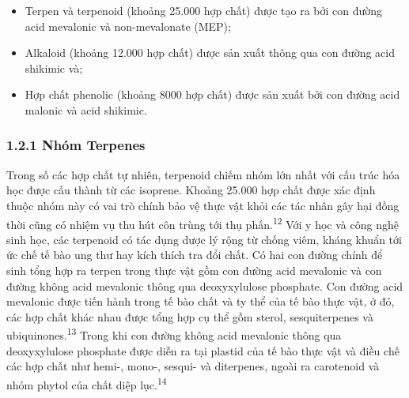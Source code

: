 \documentclass[
  letterpaper,
  DIV=11,
  numbers=noendperiod]{scrartcl}
\begin{document}
\begin{itemize}
\item
  Terpen và terpenoid (khoảng 25.000 hợp chất) được tạo ra bởi con đường
  acid mevalonic và non-mevalonate (MEP);
\item
  Alkaloid (khoảng 12.000 hợp chất) được sản xuất thông qua con đường
  acid shikimic và;
\item
  Hợp chất phenolic (khoảng 8000 hợp chất) được sản xuất bởi con đường
  acid malonic và acid shikimic.
\end{itemize}

\subsubsection{1.2.1 Nhóm Terpenes}\label{nhuxf3m-terpenes}

Trong số các hợp chất tự nhiên, terpenoid chiếm nhóm lớn nhất với cấu
trúc hóa học được cấu thành từ các isoprene. Khoảng 25.000 hợp chất được
xác định thuộc nhóm này có vai trò chính bảo vệ thực vật khỏi các tác
nhân gây hại đồng thời cũng có nhiệm vụ thu hút côn trùng tới thụ
phấn.\textsuperscript{12} Với y học và công nghệ sinh học, các terpenoid
có tác dụng dược lý rộng từ chống viêm, kháng khuẩn tới ức chế tế bào
ung thư hay kích thích tra đổi chất. Có hai con đường chính để sinh tổng
hợp ra terpen trong thực vật gồm con đường acid mevalonic và con đường
không acid mevalonic thông qua deoxyxylulose phosphate. Con đường acid
mevalonic được tiến hành trong tế bào chất và ty thể của tế bào thực
vật, ở đó, các hợp chất khác nhau được tổng hợp cụ thể gồm sterol,
sesquiterpenes và ubiquinones.\textsuperscript{13} Trong khi con đường
không acid mevalonic thông qua deoxyxylulose phosphate được diễn ra tại
plastid của tế bào thực vật và điều chế các hợp chất như hemi-, mono-,
sesqui- và diterpenes, ngoài ra carotenoid và nhóm phytol của chất diệp
lục.\textsuperscript{14}\\
\end{document}

